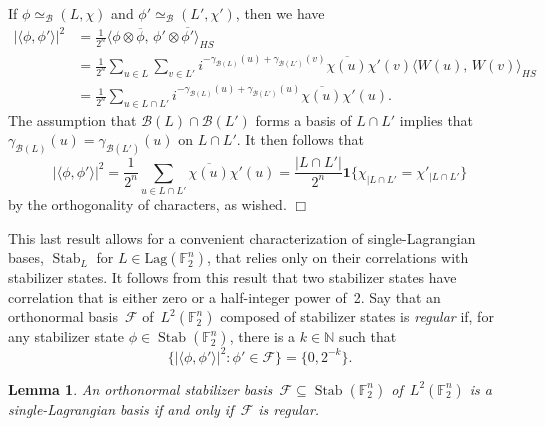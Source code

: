 \documentclass[11pt]{amsart}
\newcommand{\Lag}{\mathrm{Lag}}
\DeclareMathOperator{\Stab}{Stab}\DeclareMathOperator{\Spec}{Spec}
\newcommand{\N}{\mathbb{N}} %
\newcommand{\F}{\mathbb{F}} %
\newcommand{\one}{\mathbf{1}}
\newcommand{\B}{\mathcal B}
\theoremstyle{plain}
\newtheorem{lemma}[theorem]{Lemma}
\theoremstyle{definition}
\theoremstyle{remark}
\renewenvironment{proof}[1][]{
    	\begin{trivlist}
     	\item[\hspace{\labelsep}{\em\noindent Proof#1:\/}]}
     	{{\hfill$\Box$}
    	\end{trivlist}
  }
\begin{document}
\begin{proof}
If $\phi \simeq_\B (L, \chi)$ and $\phi' \simeq_\B (L', \chi')$, then we have
\begin{align*}
    |\langle\phi, \phi'\rangle|^2
    &= \frac{1}{2^n} \big\langle \phi\otimes\overline{\phi},\, \phi'\otimes\overline{\phi'} \big\rangle_{HS} \\
    &= \frac{1}{2^n} \sum_{u\in L} \sum_{v\in L'} i^{-\gamma_{\B(L)}(u)+ \gamma_{\B(L')}(v)} \overline{\chi(u)} \chi'(v) \big\langle W(u),\, W(v)\big\rangle_{HS} \\
    &= \frac{1}{2^n} \sum_{u\in L\cap L'} i^{-\gamma_{\B(L)}(u)+ \gamma_{\B(L')}(u)} \overline{\chi(u)} \chi'(u).
\end{align*}
The assumption that $\B(L) \cap \B(L')$ forms a basis of $L\cap L'$ implies that $\gamma_{\B(L)}(u) = \gamma_{\B(L')}(u)$ on $L\cap L'$.
It then follows that
$$|\langle\phi, \phi'\rangle|^2 = \frac{1}{2^n} \sum_{u \in L\cap L'} \overline{\chi(u)} \chi'(u) = \frac{|L\cap L'|}{2^n} \one\{\chi_{|L\cap L'} = \chi'_{|L\cap L'}\}$$
by the orthogonality of characters, as wished.
\end{proof}


This last result allows for a convenient characterization of single-Lagrangian bases, $\Stab_L$ for $L\in\Lag(\F_2^n)$, that relies only on their correlations with stabilizer states.
It follows from this result that two stabilizer states have correlation that is either zero or a half-integer power of~2.
Say that an orthonormal basis~$\mathcal F$ of~$L^2(\F_2^n)$ composed of stabilizer states is \emph{regular} if, for any stabilizer state $\phi \in\Stab(\F_2^n)$, there is a $k\in \N$ such that
\begin{equation*}
    \{|\langle \phi,\phi'\rangle|^2 : \phi'\in \mathcal F\} = \{0,2^{-k}\}.
\end{equation*}

\begin{lemma} \label{lem:signature}
    An orthonormal stabilizer basis~$\mathcal F\subseteq\Stab(\F_2^n)$ of~$L^2(\F_2^n)$ is a single-Lagrangian basis if and only if~$\mathcal F$ is regular.
\end{lemma}
\end{document}
